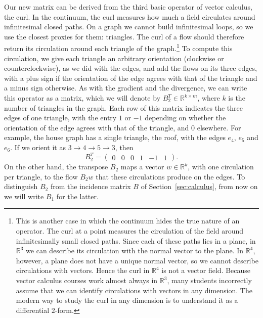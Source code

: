 \documentclass[11pt,a4paper]{article}
\theoremstyle{plain}
\theoremstyle{definition}
\newcommand{\R}{\mathbb{R}}
\begin{document}
Our new matrix can be derived from the third basic operator of vector calculus, the curl. In the continuum, the curl measures how much a field circulates around infinitesimal closed paths. On a graph we cannot build infinitesimal loops, so we use the closest proxies for them: triangles. The curl of a flow should therefore return its circulation around each triangle of the graph.\footnote{\label{fn:curl}This is another case in which the continuum hides the true nature of an operator. The curl at a point measures the circulation of the field around infinitesimally small closed paths. Since each of these paths lies in a plane, in $\R^3$ we can describe its circulation with the normal vector to the plane. In $\R^4$, however, a plane does not have a unique normal vector, so we cannot describe circulations with vectors. Hence the curl in $\R^4$ is not a vector field. Because vector calculus courses work almost always in $\R^3$, many students incorrectly assume that we can identify circulations with vectors in any dimension. The modern way to study the curl in any dimension is to understand it as a differential $2$-form.} To compute this circulation, we give each triangle an arbitrary orientation (clockwise or counterclockwise), as we did with the edges, and add the flows on its three edges, with a plus sign if the orientation of the edge agrees with that of the triangle and a minus sign otherwise. As with the gradient and the divergence, we can write this operator as a matrix, which we will denote by $B_2^T\in \R^{k \times m}$, where $k$ is the number of triangles in the graph. Each row of this matrix indicates the three edges of one triangle, with the entry $1$ or $-1$ depending on whether the orientation of the edge agrees with that of the triangle, and $0$ elsewhere. For example, the house graph has a single triangle, the roof, with the edges $e_4$, $e_5$ and $e_6$. If we orient it as $3\to4\to5\to3$, then
\[
B_2^T=\begin{pmatrix}0&0&0&1&-1&1\end{pmatrix}.
\]
On the other hand, the transpose $B_2$ maps a vector $w\in\R^k$, with one circulation per triangle, to the flow $B_2w$ that these circulations produce on the edges. To distinguish $B_2$ from the incidence matrix $B$ of Section~\ref{sec:calculus}, from now on we will write $B_1$ for the latter.
\end{document}
